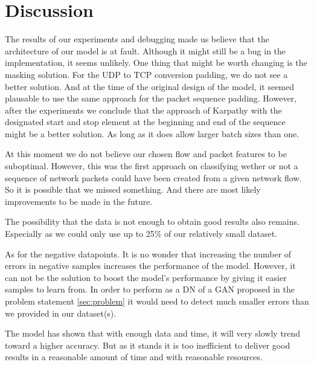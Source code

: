 \documentclass[
	ngerman,
	ruledheaders=section,%
	class=report,%
	thesis={type=bachelor},%
	accentcolor=9c,%
	custommargins=true,%
	marginpar=false,%
	parskip=half-,%
	fontsize=11pt,%
	twoside
]{tudapub}
\begin{document}
\section{Discussion}
\label{sec:exDiscussion}

The results of our experiments and debugging made us believe that the architecture of our model is at fault.
Although it might still be a bug in the implementation, it seems unlikely.
One thing that might be worth changing is the masking solution.
For the UDP to TCP conversion padding, we do not see a better solution.
And at the time of the original design of the model, it seemed plausable to use the same approach for the packet sequence padding.
However, after the experiments we conclude that the approach of Karpathy \cite{karpathyDeepVisualSemanticAlignments2015} with the designated start and stop element at the beginning and end of the sequence might be a better solution.
As long as it does allow larger batch sizes than one.

At this moment we do not believe our chosen flow and packet features to be suboptimal.
However, this was the first approach on classifying wether or not a sequence of network packets could have been created from a given network flow.
So it is possible that we missed something.
And there are most likely improvements to be made in the future.

The possibility that the data is not enough to obtain good results also remains.
Especially as we could only use up to 25\% of our relatively small dataset.

As for the negative datapoints.
It is no wonder that increasing the number of errors in negative samples increases the performance of the model.
However, it can not be the solution to boost the model's performance by giving it easier samples to learn from.
In order to perform as a DN of a GAN proposed in the problem statement \ref{sec:problem} it would need to detect much smaller errors than we provided in our dataset(s).

The model has shown that with enough data and time, it will very slowly trend toward a higher accuracy.
But as it stands it is too inefficient to deliver good results in a reasonable amount of time and with reasonable resources.
\end{document}
